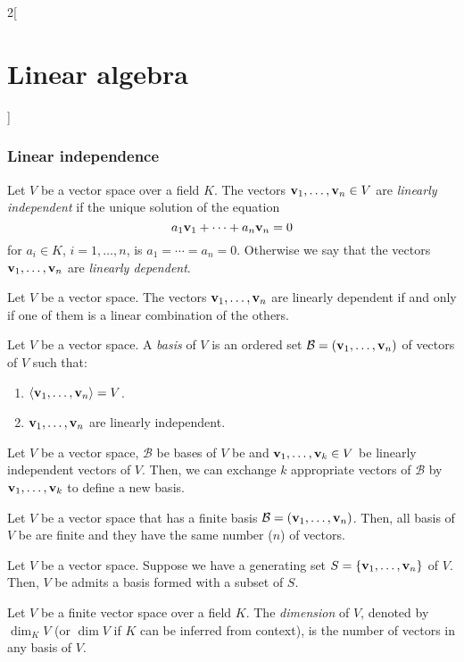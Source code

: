 \documentclass[../../../main.tex]{subfiles}
\begin{document}
\begin{multicols}{2}[\section{Linear algebra}]
  \subsubsection{Linear independence}
  \begin{definition}
    Let $V$ be a vector space over a field $K$. The vectors $\boldsymbol{\mathrm{v}}_1,\ldots,\boldsymbol{\mathrm{v}}_n\in V$ are \emph{linearly independent} if the unique solution of the equation $$a_1\boldsymbol{\mathrm{v}}_1+\cdots+a_n\boldsymbol{\mathrm{v}}_n=0$$ for $a_i\in K$, $i=1,\ldots,n$, is $a_1=\cdots=a_n=0$. Otherwise we say that the vectors $\boldsymbol{\mathrm{v}}_1,\ldots,\boldsymbol{\mathrm{v}}_n$ are \emph{linearly dependent}.
  \end{definition}
  \begin{lemma}
    Let $V$ be a vector space. The vectors $\boldsymbol{\mathrm{v}}_1,\ldots,\boldsymbol{\mathrm{v}}_n$ are linearly dependent if and only if one of them is a linear combination of the others.
  \end{lemma}
  \begin{definition}
    Let $V$ be a vector space. A \emph{basis} of $V$ is an ordered set $\mathcal{B}=(\boldsymbol{\mathrm{v}}_1,\ldots,\boldsymbol{\mathrm{v}}_n)$ of vectors of $V$ such that:
    \begin{enumerate}
      \item $\langle \boldsymbol{\mathrm{v}}_1,\ldots,\boldsymbol{\mathrm{v}}_n\rangle = V$.
      \item $\boldsymbol{\mathrm{v}}_1,\ldots,\boldsymbol{\mathrm{v}}_n$ are linearly independent.
    \end{enumerate}
  \end{definition}
  \begin{lemma}
    Let $V$ be a vector space, $\mathcal{B}$ be bases of $V$ be and $\boldsymbol{\mathrm{v}}_1,\ldots,\boldsymbol{\mathrm{v}}_k\in V$ be linearly independent vectors of $V$. Then, we can exchange $k$ appropriate vectors of $\mathcal{B}$ by $\boldsymbol{\mathrm{v}}_1,\ldots,\boldsymbol{\mathrm{v}}_k$ to define a new basis.
  \end{lemma}
  \begin{corollary}
    Let $V$ be a vector space that has a finite basis $\mathcal{B}=(\boldsymbol{\mathrm{v}}_1,\ldots,\boldsymbol{\mathrm{v}}_n)$. Then, all basis of $V$ be are finite and they have the same number ($n$) of vectors.
  \end{corollary}
  \begin{lemma}
    Let $V$ be a vector space. Suppose we have a generating set $S=\{\boldsymbol{\mathrm{v}}_1,\ldots,\boldsymbol{\mathrm{v}}_n\}$ of $V$. Then, $V$ be admits a basis formed with a subset of $S$.
  \end{lemma}
  \begin{definition}
    Let $V$ be a finite vector space over a field $K$. The \emph{dimension} of $V$, denoted by $\dim_K V$ (or $\dim V$ if $K$ can be inferred from context), is the number of vectors in any basis of $V$.

\end{definition}
\end{multicols}
\end{document}
